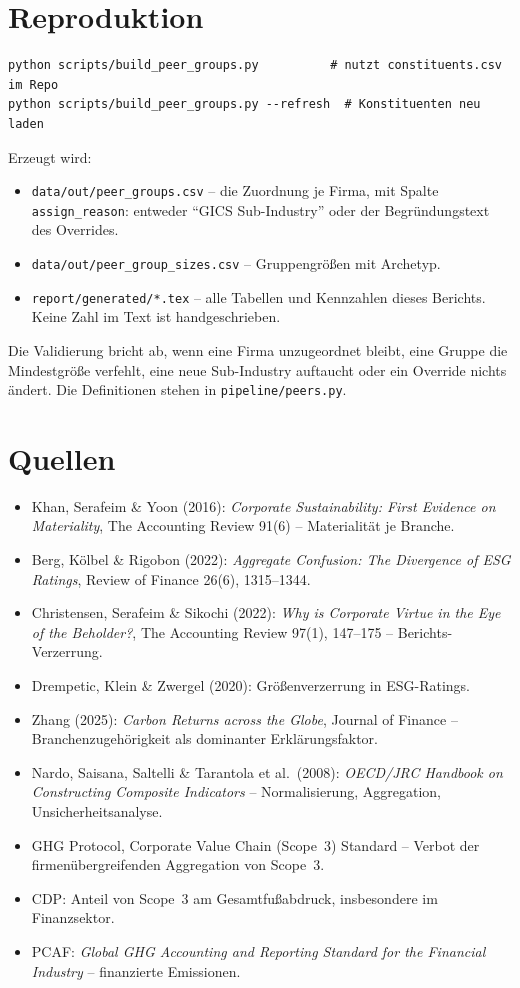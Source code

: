 \documentclass[11pt,a4paper]{article}
\begin{document}
\section{Reproduktion}

\begin{verbatim}
python scripts/build_peer_groups.py          # nutzt constituents.csv im Repo
python scripts/build_peer_groups.py --refresh  # Konstituenten neu laden
\end{verbatim}

Erzeugt wird:

\begin{itemize}[leftmargin=1.2em]
\item \texttt{data/out/peer\_groups.csv} -- die Zuordnung je Firma, mit Spalte \texttt{assign\_reason}: entweder ``GICS Sub-Industry'' oder der Begründungstext des Overrides.
\item \texttt{data/out/peer\_group\_sizes.csv} -- Gruppengrößen mit Archetyp.
\item \texttt{report/generated/*.tex} -- alle Tabellen und Kennzahlen dieses Berichts. Keine Zahl im Text ist handgeschrieben.
\end{itemize}

Die Validierung bricht ab, wenn eine Firma unzugeordnet bleibt, eine Gruppe die Mindestgröße verfehlt, eine neue Sub-Industry auftaucht oder ein Override nichts ändert. Die Definitionen stehen in \texttt{pipeline/peers.py}.

\section*{Quellen}
\begin{itemize}[leftmargin=1.2em]
\item Khan, Serafeim \& Yoon (2016): \emph{Corporate Sustainability: First Evidence on Materiality}, The Accounting Review 91(6) -- Materialität je Branche.
\item Berg, Kölbel \& Rigobon (2022): \emph{Aggregate Confusion: The Divergence of ESG Ratings}, Review of Finance 26(6), 1315--1344.
\item Christensen, Serafeim \& Sikochi (2022): \emph{Why is Corporate Virtue in the Eye of the Beholder?}, The Accounting Review 97(1), 147--175 -- Berichts-Verzerrung.
\item Drempetic, Klein \& Zwergel (2020): Größenverzerrung in ESG-Ratings.
\item Zhang (2025): \emph{Carbon Returns across the Globe}, Journal of Finance -- Branchenzugehörigkeit als dominanter Erklärungsfaktor.
\item Nardo, Saisana, Saltelli \& Tarantola et al.\ (2008): \emph{OECD/JRC Handbook on Constructing Composite Indicators} -- Normalisierung, Aggregation, Unsicherheitsanalyse.
\item GHG Protocol, Corporate Value Chain (Scope~3) Standard -- Verbot der firmenübergreifenden Aggregation von Scope~3.
\item CDP: Anteil von Scope~3 am Gesamtfußabdruck, insbesondere im Finanzsektor.
\item PCAF: \emph{Global GHG Accounting and Reporting Standard for the Financial Industry} -- finanzierte Emissionen.
\end{itemize}
\end{document}
